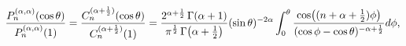 \[\frac{\mathop{P^{(\alpha,\alpha)}_{n}\/}\nolimits\!\left(\mathop{\cos\/}%
\nolimits\theta\right)}{\mathop{P^{(\alpha,\alpha)}_{n}\/}\nolimits\!\left(1%
\right)}=\frac{\mathop{C^{(\alpha+\frac{1}{2})}_{n}\/}\nolimits\!\left(\mathop%
{\cos\/}\nolimits\theta\right)}{\mathop{C^{(\alpha+\frac{1}{2})}_{n}\/}%
\nolimits\!\left(1\right)}=\frac{2^{\alpha+\frac{1}{2}}\mathop{\Gamma\/}%
\nolimits\!\left(\alpha+1\right)}{\pi^{\frac{1}{2}}\mathop{\Gamma\/}\nolimits%
\!\left(\alpha+\frac{1}{2}\right)}(\mathop{\sin\/}\nolimits\theta)^{-2\alpha}%
\int_{0}^{\theta}\frac{\mathop{\cos\/}\nolimits\!\left((n+\alpha+\tfrac{1}{2})%
\phi\right)}{(\mathop{\cos\/}\nolimits\phi-\mathop{\cos\/}\nolimits\theta)^{-%
\alpha+\frac{1}{2}}}d\phi,\]